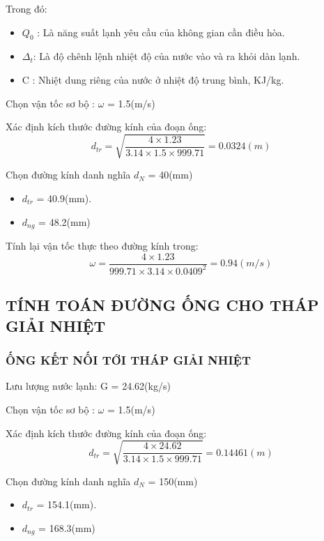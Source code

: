 Trong đó:
\begin{itemize}
	\item $Q_{0}$ : Là năng suất lạnh yêu cầu của không gian cần điều hòa.
	\item $\Delta_{t}$: Là độ chênh lệnh nhiệt độ của nước vào và ra khỏi dàn lạnh.
	\item C : Nhiệt dung riêng của nước ở nhiệt độ trung bình, KJ/kg.
\end{itemize}

Chọn vận tốc sơ bộ : $\omega$ = 1.5(m/s)

Xác định kích thước đường kính của đoạn ống:
\begin{equation*}
	d_{tr} = \sqrt{\dfrac{4 \times 1.23}{3.14 \times 1.5 \times 999.71}} =0.0324 (m)
\end{equation*}

Chọn đường kính danh nghĩa $d_{N}$ = 40(mm)
\begin{itemize}
	\item $d_{tr}$ = 40.9(mm).
	\item $d_{ng}$ = 48.2(mm)
\end{itemize}

Tính lại vận tốc thực theo đường kính trong:
\begin{equation*}
	\omega = \dfrac{4 \times 1.23 }{999.71 \times 3.14 \times 0.0409^{2}} = 0.94(m/s)
\end{equation*}

\subsection{TÍNH TOÁN ĐƯỜNG ỐNG CHO THÁP GIẢI NHIỆT}

\subsubsection{ỐNG KẾT NỐI TỚI THÁP GIẢI NHIỆT}

Lưu lượng nước lạnh: G = 24.62(kg/s)

Chọn vận tốc sơ bộ : $\omega$ = 1.5(m/s)

Xác định kích thước đường kính của đoạn ống:
\begin{equation*}
	d_{tr} = \sqrt{\dfrac{4 \times 24.62}{3.14 \times 1.5 \times 999.71}} =0.14461 (m)
\end{equation*}

Chọn đường kính danh nghĩa $d_{N}$ = 150(mm)
\begin{itemize}
	\item $d_{tr}$ = 154.1(mm).
	\item $d_{ng}$ = 168.3(mm)
\end{itemize}

